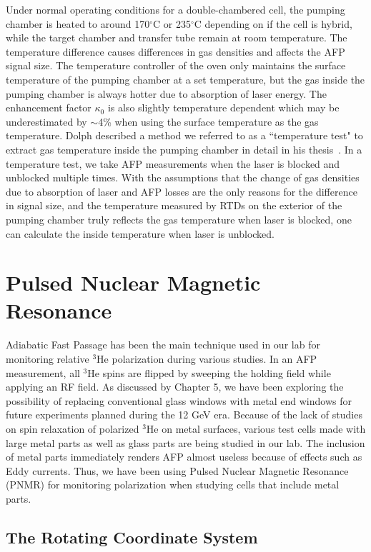 Under normal operating conditions for a double-chambered cell, the pumping chamber is heated to around 170$^{\circ}$C or 235$^{\circ}$C depending on if the cell is hybrid, while the target chamber and transfer tube remain at room temperature. The temperature difference causes differences in gas densities and affects the AFP signal size. The temperature controller of the oven only maintains the surface temperature of the pumping chamber at a set temperature, but the gas inside the pumping chamber is always hotter due to absorption of laser energy. The enhancement factor $\kappa_{0}$ is also slightly temperature dependent which may be underestimated by $\sim$4\% when using the surface temperature as the gas temperature. Dolph described a method we referred to as a ``temperature test" to extract gas temperature inside the pumping chamber in detail in his thesis~\cite{PeterThesis}. In a temperature test, we take AFP measurements when the laser is blocked and unblocked multiple times. With the assumptions that the change of gas densities due to absorption of laser and AFP losses are the only reasons for the difference in signal size, and the temperature measured by RTDs on the exterior of the pumping chamber truly reflects the gas temperature when laser is blocked, one can calculate the inside temperature when laser is unblocked. 

\section{Pulsed Nuclear Magnetic Resonance} 

Adiabatic Fast Passage has been the main technique used in our lab for monitoring relative $^{3}$He polarization during various studies. In an AFP measurement, all $^{3}$He spins are flipped by sweeping the holding field while applying an RF field. As discussed by Chapter 5, we have been exploring the possibility of replacing conventional glass windows with metal end windows for future experiments planned during the 12 GeV era. Because of the lack of studies on spin relaxation of polarized $^{3}$He on metal surfaces, various test cells made with large metal parts as well as glass parts are being studied in our lab. The inclusion of metal parts immediately renders AFP almost useless because of effects such as Eddy currents. Thus, we have been using Pulsed Nuclear Magnetic Resonance (PNMR) for monitoring polarization when studying cells that include metal parts.

\subsection{The Rotating Coordinate System}

